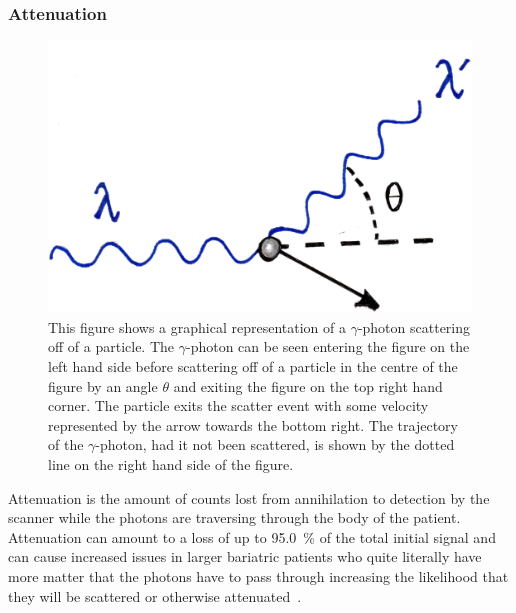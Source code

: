             \subsubsection{Attenuation} \label{sec:attenuation}
                \begin{figure}
                    \centering
                    
                    \includegraphics[width=1.0\linewidth]{figures/background_scatter.png}
                    
                    \captionsetup{singlelinecheck=false, justification=raggedright}
                    \caption{This figure shows a graphical representation of a $\gamma$-photon scattering off of a particle. The $\gamma$-photon can be seen entering the figure on the left hand side before scattering off of a particle in the centre of the figure by an angle $\theta$ and exiting the figure on the top right hand corner. The particle exits the scatter event with some velocity represented by the arrow towards the bottom right. The trajectory of the $\gamma$-photon, had it not been scattered, is shown by the dotted line on the right hand side of the figure.} \label{fig:attenuation_scatter}
                \end{figure}
                
                Attenuation is the amount of counts lost from annihilation to detection by the scanner while the photons are traversing through the body of the patient. Attenuation can amount to a loss of up to \SI{95.0}{\percent} of the total initial signal and can cause increased issues in larger bariatric patients who quite literally have more matter that the photons have to pass through increasing the likelihood that they will be scattered or otherwise attenuated~.
                

